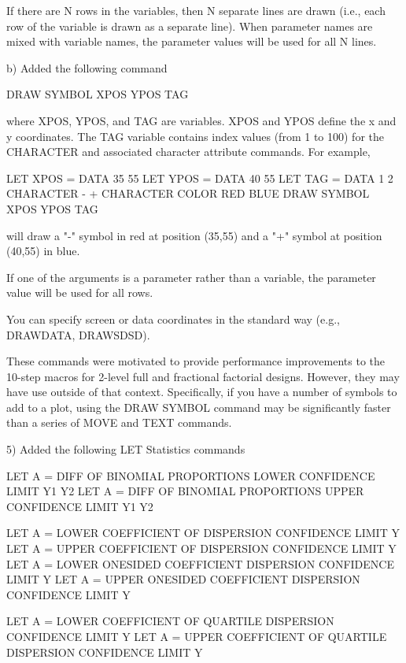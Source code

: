        If there are N rows in the variables, then N separate lines are
       drawn (i.e., each row of the variable is drawn as a separate line).
       When parameter names are mixed with variable names, the parameter
       values will be used for all N lines.

    b) Added the following command

           DRAW SYMBOL XPOS YPOS TAG

       where XPOS, YPOS, and TAG are variables.  XPOS and YPOS define
       the x and y coordinates.  The TAG variable contains index values
       (from 1 to 100) for the CHARACTER and associated character
       attribute commands.  For example,

           LET XPOS = DATA 35 55
           LET YPOS = DATA 40 55
           LET TAG  = DATA  1  2
           CHARACTER  - +
           CHARACTER COLOR RED BLUE
           DRAW SYMBOL XPOS YPOS TAG

        will draw a "-" symbol in red at position (35,55) and a "+" symbol
        at position (40,55) in blue.

        If one of the arguments is a parameter rather than a variable, the
        parameter value will be used for all rows.

        You can specify screen or data coordinates in the standard way
        (e.g., DRAWDATA, DRAWSDSD).

    These commands were motivated to provide performance improvements to
    the 10-step macros for 2-level full and fractional factorial designs.
    However, they may have use outside of that context.  Specifically,
    if you have a number of symbols to add to a plot, using the
    DRAW SYMBOL command may be significantly faster than a series of
    MOVE and TEXT commands.

 5) Added the following LET Statistics commands

       LET A = DIFF OF BINOMIAL PROPORTIONS LOWER CONFIDENCE LIMIT Y1 Y2
       LET A = DIFF OF BINOMIAL PROPORTIONS UPPER CONFIDENCE LIMIT Y1 Y2

       LET A = LOWER COEFFICIENT OF DISPERSION CONFIDENCE LIMIT Y
       LET A = UPPER COEFFICIENT OF DISPERSION CONFIDENCE LIMIT Y
       LET A = LOWER ONESIDED COEFFICIENT DISPERSION CONFIDENCE LIMIT Y
       LET A = UPPER ONESIDED COEFFICIENT DISPERSION CONFIDENCE LIMIT Y

       LET A = LOWER COEFFICIENT OF QUARTILE DISPERSION CONFIDENCE LIMIT Y
       LET A = UPPER COEFFICIENT OF QUARTILE DISPERSION CONFIDENCE LIMIT Y

